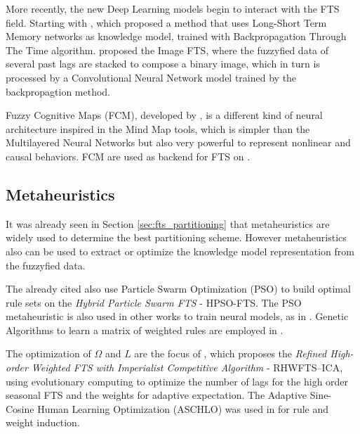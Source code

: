 More recently, the new Deep Learning models begin to interact with the FTS field. Starting with \cite{Tran2018}, which proposed a method that uses Long-Short Term Memory networks as knowledge model, trained with Backpropagation Through The Time algorithm. \cite{Sadaei2019} proposed the Image FTS, where the fuzzyfied data of several past lags are stacked to compose a binary image, which in turn is processed by a Convolutional Neural Network model trained by the backpropagtion method. 

Fuzzy Cognitive Maps (FCM), developed by \cite{Kosko1986}, is a different kind of neural architecture inspired in the Mind Map tools, which is simpler than the Multilayered Neural Networks but also very powerful to represent nonlinear and causal behaviors. FCM are used as backend for FTS on \cite{Homenda2014, Homenda2017, Yang2018c}. 

%
\subsection{Metaheuristics}
\label{sec:fts_evolutionary}

It was already seen in Section \ref{sec:fts_partitioning} that metaheuristics are widely used to determine the best partitioning scheme. However metaheuristics also can be used to extract or optimize the knowledge model representation from the fuzzyfied data.

The already cited \cite{Kuo2009} also use Particle Swarm Optimization (PSO) to build optimal rule sets on the \textit{Hybrid Particle Swarm FTS} - HPSO-FTS. The PSO metaheuristic is also used in other works to train neural models, as in \cite{Bas2015, Yolcu2017, Bas2018}. Genetic Algorithms to learn a matrix of weighted rules are employed in \cite{Ye2016}.

The optimization of $\Omega$ and $L$ are the focus of \cite{Enayatifar2013}, which proposes the \textit{Refined High-order Weighted FTS with Imperialist Competitive Algorithm} - RHWFTS–ICA, using evolutionary computing to optimize the number of lags for the high order seasonal FTS and the weights for adaptive expectation. The Adaptive Sine-Cosine Human Learning Optimization (ASCHLO) was used in \cite{Yang2018} for rule and weight induction.


%
